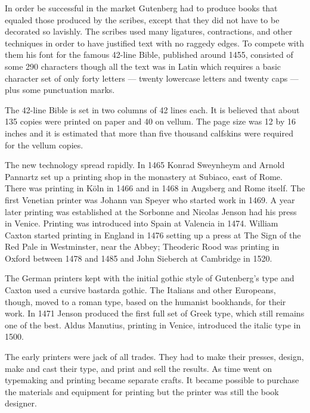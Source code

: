 \documentclass[10pt,a4paper,oneside,extrafontsizes]{memoir}%
\begin{document}
\begin{paracol}{2}
    In order be successful in the market Gutenberg had to produce books
that equaled those produced by the scribes, except that they did not
have to be decorated so lavishly. The scribes used many ligatures,
contractions, and other techniques in order to have justified text with
no raggedy edges. To compete with them his font for the famous 42-line 
Bible, published around 1455, consisted of some 290 characters though all
the text was in Latin which requires a basic character set of only forty 
letters --- twenty lowercase letters and twenty caps --- plus
some punctuation marks.

    The 42-line Bible is set in two columns of 42 lines each. It is believed
that about 135 copies were printed on paper and 40 on vellum. The page size was
12 by 16 inches and it is estimated that more than five 
thousand calfskins were required for the vellum copies.

    The new technology spread rapidly. In 1465 
Konrad Sweynheym and Arnold
Pannartz set up a printing shop in the monastery at Subiaco, east of Rome.
There was printing in K\"{o}ln in 1466 and in 1468 in Augsberg and Rome itself.
The first Venetian printer was Johann van Speyer 
who started work in 1469. A year later printing was established at the 
Sorbonne and Nicolas Jenson
had his press in Venice. Printing was introduced into Spain at Valencia 
in 1474. William Caxton started printing in England 
in 1476 setting up a press at The Sign of the Red Pale in Westminster, 
near the Abbey; Theoderic Rood was printing in 
Oxford between 1478 and 1485 and John Sieberch at 
Cambridge in 1520.

    The German printers kept with the initial gothic
style of Gutenberg's type and Caxton used a cursive bastarda gothic. The
Italians and other Europeans, though, moved to a roman type, based on the
humanist bookhands, for their
work. In 1471 Jenson produced the first full set of Greek type, which still
remains one of the best. Aldus Manutius, printing in 
Venice, introduced the italic type in 1500.

   The early printers were jack of all trades. They had to make their presses,
design, make and cast their type, 
and print and sell the results. As time went
on typemaking and printing became separate crafts. It became possible to 
purchase the materials and equipment for printing but the printer was still
the book designer.


\end{paracol}
\end{document}

